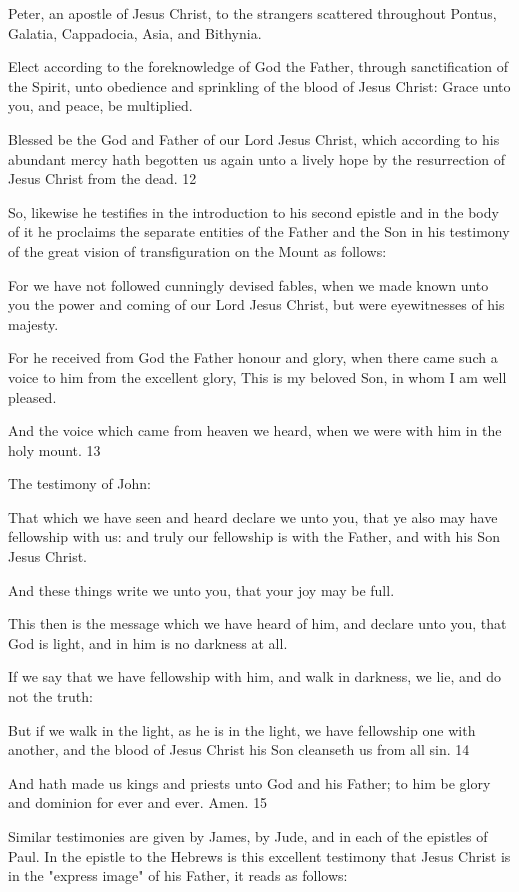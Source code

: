Peter, an apostle of Jesus Christ, to the strangers scattered throughout Pontus, Galatia,
Cappadocia, Asia, and Bithynia.

Elect according to the foreknowledge of God the Father, through sanctification of the Spirit,
unto obedience and sprinkling of the blood of Jesus Christ: Grace unto you, and peace, be
multiplied.

Blessed be the God and Father of our Lord Jesus Christ, which according to his abundant
mercy hath begotten us again unto a lively hope by the resurrection of Jesus Christ from the
dead. 12

So, likewise he testifies in the introduction to his second epistle and in the body of it he
proclaims the separate entities of the Father and the Son in his testimony of the great vision
of transfiguration on the Mount as follows:

For we have not followed cunningly devised fables, when we made known unto you the
power and coming of our Lord Jesus Christ, but were eyewitnesses of his majesty.

For he received from God the Father honour and glory, when there came such a voice to him
from the excellent glory, This is my beloved Son, in whom I am well pleased.

And the voice which came from heaven we heard, when we were with him in the holy
mount. 13

The testimony of John:

That which we have seen and heard declare we unto you, that ye also may have fellowship
with us: and truly our fellowship is with the Father, and with his Son Jesus Christ.

And these things write we unto you, that your joy may be full.

This then is the message which we have heard of him, and declare unto you, that God is light,
and in him is no darkness at all.

If we say that we have fellowship with him, and walk in darkness, we lie, and do not the
truth:

But if we walk in the light, as he is in the light, we have fellowship one with another, and the
blood of Jesus Christ his Son cleanseth us from all sin. 14

And hath made us kings and priests unto God and his Father; to him be glory and dominion
for ever and ever. Amen. 15

Similar testimonies are given by James, by Jude, and in each of the epistles of Paul. In the
epistle to the Hebrews is this excellent testimony that Jesus Christ is in the "express image"
of his Father, it reads as follows:

